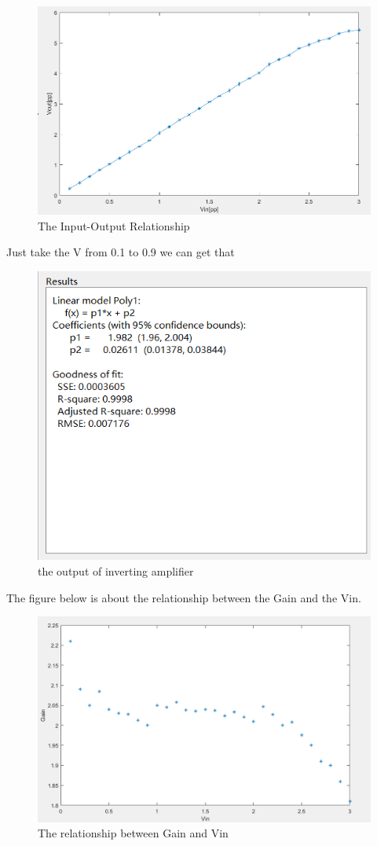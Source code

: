 \documentclass{article}
\begin{document}
\begin{figure}[H]
	\centering
	\includegraphics[width=0.7\linewidth]{inverting}
	\caption{The Input-Output Relationship}
	\label{fig:inverting}
\end{figure}
Just take the V from 0.1 to 0.9 we can get that 
\begin{figure}[H]
	\centering
	\includegraphics[width=0.7\linewidth]{invertingcf}
	\caption{the output of inverting amplifier	}
	\label{fig:invertingcf}
\end{figure}
The figure below is about the relationship between the Gain and the Vin.
\begin{figure}[H]
	\centering
	\includegraphics[width=0.7\linewidth]{gv2}
	\caption{The relationship between Gain and Vin}
	\label{fig:gv2}
\end{figure}
\end{document}
